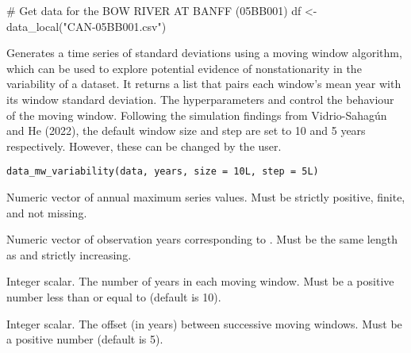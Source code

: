 \documentclass[a4paper]{book}
\begin{document}
%
\begin{SeeAlso}
\end{SeeAlso}
%
\begin{Examples}
\begin{ExampleCode}
# Get data for the BOW RIVER AT BANFF (05BB001)
df <- data_local("CAN-05BB001.csv")

\end{ExampleCode}
\end{Examples}
%
\begin{Description}
Generates a time series of standard deviations using a moving window algorithm,
which can be used to explore potential evidence of nonstationarity in the
variability of a dataset. It returns a list that pairs each window’s mean year with
its window standard deviation. The hyperparameters  and  control the
behaviour of the moving window. Following the simulation findings from Vidrio-Sahagún
and He (2022), the default window size and step are set to 10 and 5 years
respectively. However, these can be changed by the user.
\end{Description}
%
\begin{Usage}
\begin{verbatim}
data_mw_variability(data, years, size = 10L, step = 5L)
\end{verbatim}
\end{Usage}
%
\begin{Arguments}
\begin{ldescription}
\item[\code{data}] Numeric vector of annual maximum series values.
Must be strictly positive, finite, and not missing.

\item[\code{years}] Numeric vector of observation years corresponding to .
Must be the same length as  and strictly increasing.

\item[\code{size}] Integer scalar. The number of years in each moving window.
Must be a positive number less than or equal to 
(default is 10).

\item[\code{step}] Integer scalar. The offset (in years) between successive
moving windows. Must be a positive number (default is 5).
\end{ldescription}
\end{Arguments}
\end{document}

